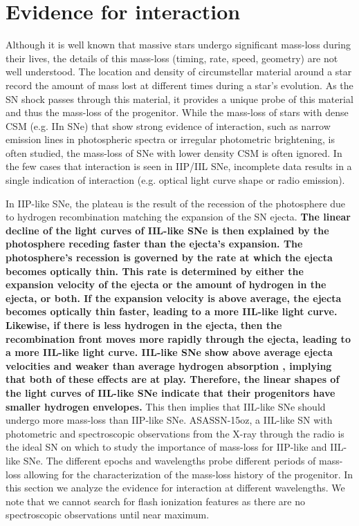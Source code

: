 \documentclass[a4paper,fleqn,usenatbib]{mnras}
\begin{document}
\section{Evidence for interaction} \label{sec:Interaction}
Although it is well known that massive stars undergo significant mass-loss during their lives, the details of this mass-loss (timing, rate, speed, geometry) are not well understood.
The location and density of circumstellar material around a star record the amount of mass lost at different times during a star's evolution. 
As the SN shock passes through this material, it provides a unique probe of this material and thus the mass-loss of the progenitor.
While the mass-loss of stars with dense CSM (e.g. IIn SNe) that show strong evidence of interaction, such as narrow emission lines in photospheric spectra or irregular photometric brightening, is often studied, the mass-loss of SNe with lower density CSM is often ignored.
In the few cases that interaction is seen in IIP/IIL SNe, incomplete data results in a single indication of interaction (e.g. optical light curve shape or radio emission).

In IIP-like SNe, the plateau is the result of the recession of the photosphere due to hydrogen recombination matching the expansion of the SN ejecta.
\textbf{The linear decline of the light curves of IIL-like SNe is then explained by the photosphere receding faster than the ejecta's expansion.
The photosphere's recession is governed by the rate at which the ejecta becomes optically thin.
This rate is determined by either the expansion velocity of the ejecta or the amount of hydrogen in the ejecta, or both. 
If the expansion velocity is above average, the ejecta becomes optically thin faster, leading to a more IIL-like light curve.
Likewise, if there is less hydrogen in the ejecta, then the recombination front moves more rapidly through the ejecta, leading to a more IIL-like light curve.
IIL-like SNe show above average ejecta velocities and weaker than average hydrogen absorption \citep{2014gutierrez}, implying that both of these effects are at play.
Therefore, the linear shapes of the light curves of IIL-like SNe indicate that their progenitors have smaller hydrogen envelopes.}
This then implies that IIL-like SNe should undergo more mass-loss than IIP-like SNe.
ASASSN-15oz, a IIL-like SN with photometric and spectroscopic observations from the X-ray through the radio is the ideal SN on which to study the importance of mass-loss for IIP-like and IIL-like SNe.
The different epochs and wavelengths probe different periods of mass-loss allowing for the characterization of the mass-loss history of the progenitor.
In this section we analyze the evidence for interaction at different wavelengths.
We note that we cannot search for flash ionization features as there are no spectroscopic observations until near maximum.
\end{document}

